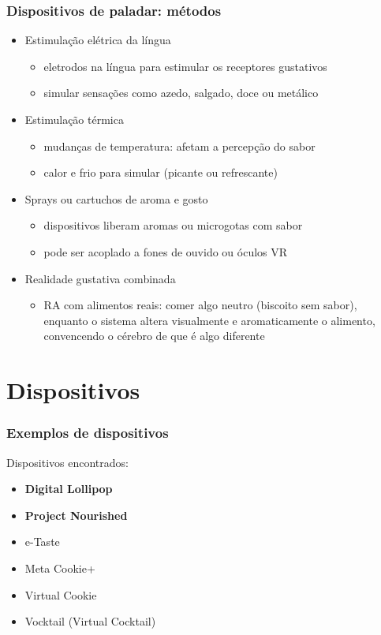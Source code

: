 \documentclass{beamer}
\begin{document}
\begin{frame}
  \frametitle{Dispositivos de paladar: métodos}
  \begin{itemize}
    \item Estimulação elétrica da língua
    \begin{itemize}
      \item eletrodos na língua para estimular os receptores gustativos
      \item simular sensações como azedo, salgado, doce ou metálico
    \end{itemize}
    \item Estimulação térmica
    \begin{itemize}
      \item mudanças de temperatura: afetam a percepção do sabor
      \item calor e frio para simular (picante ou refrescante)  
    \end{itemize}
    \item Sprays ou cartuchos de aroma e gosto
    \begin{itemize}
      \item dispositivos liberam aromas ou microgotas com sabor
      \item pode ser acoplado a fones de ouvido ou óculos VR
    \end{itemize}
    \item Realidade gustativa combinada
    \begin{itemize}
      \item RA com alimentos reais: comer algo neutro (biscoito sem sabor), enquanto o sistema altera visualmente e aromaticamente o alimento, convencendo o cérebro de que é algo diferente
    \end{itemize}
  \end{itemize}
\end{frame}

\section{Dispositivos}
\begin{frame}
  \frametitle{Exemplos de dispositivos}
  Dispositivos encontrados:
  \begin{itemize}
    \item \textbf{Digital Lollipop}
    \item \textbf{Project Nourished}
    \item e-Taste
    \item Meta Cookie+
    \item Virtual Cookie
    \item Vocktail (Virtual Cocktail)
  \end{itemize}
\end{frame}
\end{document}
